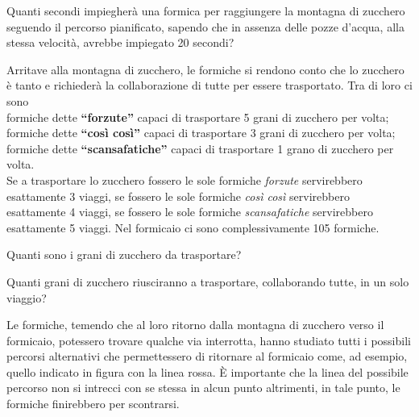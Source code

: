 \documentclass[12pt]{matemaj}
\begin{document}
\quesito[20;30]
Quanti secondi impiegherà una formica per raggiungere la montagna di zucchero seguendo il percorso pianificato, sapendo che in assenza delle pozze d'acqua, alla stessa velocità, avrebbe impiegato 20 secondi?

Arritave alla montagna di zucchero, le formiche si rendono conto che lo zucchero è tanto e richiederà la collaborazione di tutte per essere trasportato. Tra di loro ci sono\\
formiche dette {\bf ``forzute''} capaci di trasportare 5 grani di zucchero per volta;\\
formiche dette {\bf ``così così''} capaci di trasportare 3 grani di zucchero per volta;\\
formiche dette {\bf ``scansafatiche''} capaci di trasportare 1 grano di zucchero per volta.\\
Se a trasportare lo zucchero fossero le sole formiche {\it forzute} servirebbero esattamente 3 viaggi, se fossero le sole formiche {\it così così} servirebbero esattamente 4 viaggi, se fossero le sole formiche {\it scansafatiche} servirebbero esattamente 5 viaggi. Nel formicaio ci sono complessivamente 105 formiche.

\quesito[200;400]
Quanti sono i grani di zucchero da trasportare?

\quesito[200;400]
Quanti grani di zucchero riusciranno a trasportare, collaborando tutte, in un solo viaggio?

\begin{minipage}[c]{.75\textwidth}
Le formiche, temendo che al loro ritorno dalla montagna di zucchero verso il formicaio, potessero trovare qualche via interrotta, hanno studiato tutti i possibili percorsi alternativi che permettessero di ritornare al formicaio come, ad esempio, quello indicato in figura con la linea rossa. \`E importante che la linea del possibile percorso non si intrecci con se stessa in alcun punto altrimenti, in tale punto, le formiche finirebbero per scontrarsi.
\end{minipage}\hspace{.05\textwidth}
\begin{minipage}[c]{.20\textwidth}
\end{minipage}
\end{document}
